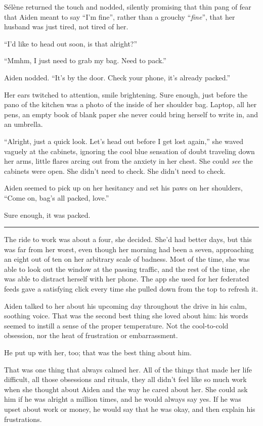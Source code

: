 Sélène returned the touch and nodded, silently promising that thin pang of fear that Aiden meant to say ``I'm fine'', rather than a grouchy ``\emph{fine}'', that her husband was just tired, not tired of her.

``I'd like to head out soon, is that alright?''

``Mmhm, I just need to grab my bag. Need to pack.''

Aiden nodded. ``It's by the door. Check your phone, it's already packed.''

Her ears twitched to attention, smile brightening. Sure enough, just before the pano of the kitchen was a photo of the inside of her shoulder bag. Laptop, all her pens, an empty book of blank paper she never could bring herself to write in, and an umbrella.

``Alright, just a quick look. Let's head out before I get lost again,'' she waved vaguely at the cabinets, ignoring the cool blue sensation of doubt traveling down her arms, little flares arcing out from the anxiety in her chest. She could \emph{see} the cabinets were open. She didn't need to check. She didn't need to check.

Aiden seemed to pick up on her hesitancy and set his paws on her shoulders, ``Come on, bag's all packed, love.''

Sure enough, it was packed.

\begin{center}\rule{0.5\linewidth}{\linethickness}\end{center}

The ride to work was about a four, she decided. She'd had better days, but this was far from her worst, even though her morning had been a seven, approaching an eight out of ten on her arbitrary scale of badness. Most of the time, she was able to look out the window at the passing traffic, and the rest of the time, she was able to distract herself with her phone. The app she used for her federated feeds gave a satisfying click every time she pulled down from the top to refresh it.

Aiden talked to her about his upcoming day throughout the drive in his calm, soothing voice. That was the second best thing she loved about him: his words seemed to instill a sense of the proper temperature. Not the cool-to-cold obsession, nor the heat of frustration or embarrassment.

He put up with her, too; that was the best thing about him.

That was one thing that always calmed her. All of the things that made her life difficult, all those obsessions and rituals, they all didn't feel like so much work when she thought about Aiden and the way he cared about her. She could ask him if he was alright a million times, and he would always say yes. If he was upset about work or money, he would say that he was okay, and then explain his frustrations.

